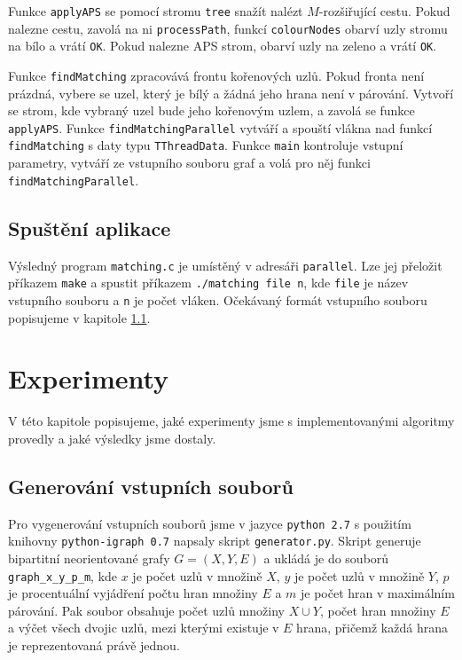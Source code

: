 \documentclass[a4paper, 11pt, titlepage, final]{article}[3. prosinec 2011]
\begin{document}
Funkce \texttt{applyAPS} se pomocí stromu \texttt{tree} snažít nalézt $M$-rozšiřující cestu. Pokud nalezne cestu, zavolá na ni \texttt{processPath}, funkcí \texttt{colourNodes} obarví uzly stromu na bílo a vrátí \texttt{OK}. Pokud nalezne APS strom, obarví uzly na zeleno a vrátí \texttt{OK}.

Funkce \texttt{findMatching} zpracovává frontu kořenových uzlů. Pokud fronta není prázdná, vybere se uzel, který je bílý a žádná jeho hrana není v párování. Vytvoří se strom, kde vybraný uzel bude jeho kořenovým uzlem, a zavolá se funkce \texttt{applyAPS}. Funkce \texttt{findMatchingParallel} vytváří a spouští vlákna nad funkcí \texttt{findMatching} s daty typu \texttt{TThreadData}. Funkce \texttt{main} kontroluje vstupní parametry, vytváří ze vstupního souboru graf a volá pro něj funkci \texttt{findMatchingParallel}.

\subsection{Spuštění aplikace}

Výsledný program \texttt{matching.c} je umístěný v adresáři \texttt{parallel}. Lze jej přeložit příkazem \texttt{make} a spustit příkazem \texttt{./matching file n}, kde \texttt{file} je název vstupního souboru a \texttt{n} je počet vláken. Očekávaný formát vstupního souboru popisujeme v kapitole \ref{secGenerating}.

\section{Experimenty} \label{secExperiment}

V této kapitole popisujeme, jaké experimenty jsme s implementovanými algoritmy provedly a jaké výsledky jsme dostaly.

\subsection{Generování vstupních souborů} \label{secGenerating}

Pro vygenerování vstupních souborů jsme v jazyce \texttt{python 2.7} s použitím knihovny \texttt{python-igraph 0.7} \cite{igraph:2003} napsaly skript \texttt{generator.py}. 
Skript generuje bipartitní neorientované grafy $G=(X,Y,E)$ a ukládá je do souborů \texttt{graph\_x\_y\_p\_m}, kde $x$ je počet uzlů v množině $X$, $y$ je počet uzlů v množině $Y$, $p$ je procentuální vyjádření počtu hran množiny $E$ a $m$ je počet hran v maximálním párování. Pak soubor obsahuje počet uzlů množiny $X \cup Y$, počet hran množiny $E$ a výčet všech dvojic uzlů, mezi kterými existuje v $E$ hrana, přičemž každá hrana je reprezentovaná právě jednou.
\end{document}
